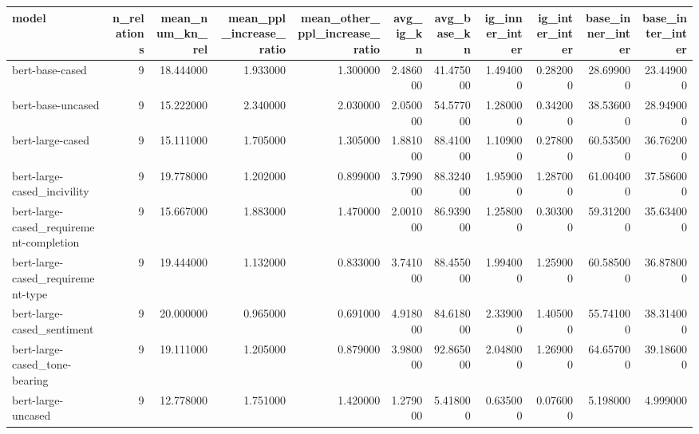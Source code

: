 \begin{tabular}{lrrrrrrrrrr}
\toprule
model & n_relations & mean_num_kn_rel & mean_ppl_increase_ratio & mean_other_ppl_increase_ratio & avg_ig_kn & avg_base_kn & ig_inner_inter & ig_inter_inter & base_inner_inter & base_inter_inter \\
\midrule
bert-base-cased & 9 & 18.444000 & 1.933000 & 1.300000 & 2.486000 & 41.475000 & 1.494000 & 0.282000 & 28.699000 & 23.449000 \\
bert-base-uncased & 9 & 15.222000 & 2.340000 & 2.030000 & 2.050000 & 54.577000 & 1.280000 & 0.342000 & 38.536000 & 28.949000 \\
bert-large-cased & 9 & 15.111000 & 1.705000 & 1.305000 & 1.881000 & 88.410000 & 1.109000 & 0.278000 & 60.535000 & 36.762000 \\
bert-large-cased_incivility & 9 & 19.778000 & 1.202000 & 0.899000 & 3.799000 & 88.324000 & 1.959000 & 1.287000 & 61.004000 & 37.586000 \\
bert-large-cased_requirement-completion & 9 & 15.667000 & 1.883000 & 1.470000 & 2.001000 & 86.939000 & 1.258000 & 0.303000 & 59.312000 & 35.634000 \\
bert-large-cased_requirement-type & 9 & 19.444000 & 1.132000 & 0.833000 & 3.741000 & 88.455000 & 1.994000 & 1.259000 & 60.585000 & 36.878000 \\
bert-large-cased_sentiment & 9 & 20.000000 & 0.965000 & 0.691000 & 4.918000 & 84.618000 & 2.339000 & 1.405000 & 55.741000 & 38.314000 \\
bert-large-cased_tone-bearing & 9 & 19.111000 & 1.205000 & 0.879000 & 3.980000 & 92.865000 & 2.048000 & 1.269000 & 64.657000 & 39.186000 \\
bert-large-uncased & 9 & 12.778000 & 1.751000 & 1.420000 & 1.279000 & 5.418000 & 0.635000 & 0.076000 & 5.198000 & 4.999000 \\
\bottomrule
\end{tabular}
